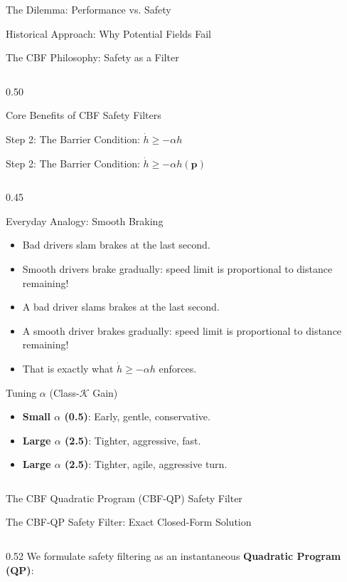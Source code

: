 \documentclass[aspectratio=169,10pt]{beamer}
\begin{document}
\begin{frame}{The Dilemma: Performance vs. Safety}
\begin{frame}{Historical Approach: Why Potential Fields Fail}
\begin{frame}{The CBF Philosophy: Safety as a Filter}
\begin{column}{0.50\textwidth}
\begin{exampleblock}{Core Benefits of CBF Safety Filters}
\begin{frame}{Step 2: The Barrier Condition: $\dot{h} \ge -\alpha h$}
\begin{frame}{Step 2: The Barrier Condition: $\dot{h} \ge -\alpha h(\mathbf{p})$}
\begin{columns}[T]
    \begin{column}{0.45\textwidth}
      \begin{exampleblock}{Everyday Analogy: Smooth Braking}
        \small
        \begin{itemize}
          \item Bad drivers slam brakes at the last second.
          \item Smooth drivers brake gradually: speed limit is proportional to distance remaining!
          \item A bad driver slams brakes at the last second.
          \item A smooth driver brakes gradually: speed limit is proportional to distance remaining!
          \item That is exactly what $\dot{h} \ge -\alpha h$ enforces.
        \end{itemize}
      \end{exampleblock}

      \vspace{0.2em}
      \begin{alertblock}{Tuning $\alpha$ (Class-$\mathcal{K}$ Gain)}
        \small
        \begin{itemize}
          \item \textbf{Small $\alpha$ (0.5)}: Early, gentle, conservative.
          \item \textbf{Large $\alpha$ (2.5)}: Tighter, aggressive, fast.
          \item \textbf{Large $\alpha$ (2.5)}: Tighter, agile, aggressive turn.
        \end{itemize}
      \end{alertblock}
    \end{column}
  \end{columns}
\end{frame}

\begin{frame}{The CBF Quadratic Program (CBF-QP) Safety Filter}
\begin{frame}{The CBF-QP Safety Filter: Exact Closed-Form Solution}
  \begin{columns}[T]
    \begin{column}{0.52\textwidth}
      We formulate safety filtering as an instantaneous \textbf{Quadratic Program (QP)}:


\end{column}
\end{columns}
\end{frame}
\end{frame}
\end{frame}
\end{exampleblock}
\end{column}
\end{frame}
\end{frame}
\end{frame}
\end{document}
